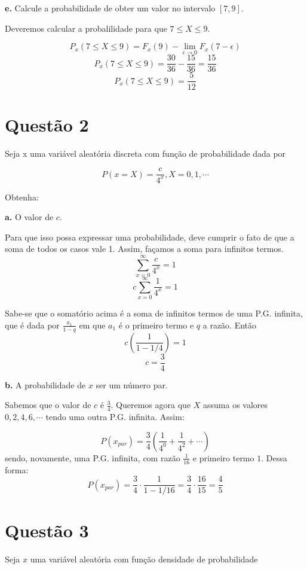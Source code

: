\documentclass[a5paper]{report}
\begin{document}
\textbf{e.}
Calcule a probabilidade de obter um valor no intervalo $[7, 9]$.

Deveremos calcular a probalilidade para que $7 \leq X \leq 9$.

\[P_x(7 \leq X \leq 9) = F_x(9) - \lim_{\epsilon\to0} F_x(7 - \epsilon)\]
\[P_x(7 \leq X \leq 9) = \frac{30}{36} - \frac{15}{36} = \frac{15}{36}\]
\[P_x(7 \leq X \leq 9) = \frac{5}{12}\]


\section*{Questão 2}
Seja x uma variável aleatória discreta com função de probabilidade dada por

\[P(x=X) = \frac{c}{4^x}, X = 0, 1, \cdots\]

Obtenha:

\textbf{a.} O valor de $c$.

Para que isso possa expressar uma probabilidade, deve cumprir o fato de que a soma de todos os casos vale 1. Assim, façamos a soma para infinitos termos.
\[\sum_{x = 0}^{\infty} \frac{c}{4^x} = 1\]
\[c \sum_{x = 0}^{\infty} \frac{1}{4^x} = 1\]

Sabe-se que o somatório acima é a soma de infinitos termos de uma P.G. infinita, que é dada por $\frac{a_1}{1 - q}$ em que $a_1$ é o primeiro termo e $q$ a razão. Então
\[c \left(\frac{1}{1 - 1/4}\right) = 1\]
\[c = \frac{3}{4}\]

\textbf{b.} A probabilidade de $x$ ser um número par.

Sabemos que o valor de $c$ é $\frac{3}{4}$. Queremos agora que $X$ assuma os valores $0, 2, 4, 6, \cdots$ tendo uma outra P.G. infinita. Assim:

\[P(x_{par}) = \frac{3}{4} \left(\frac{1}{4^0} + \frac{1}{4^2} + \cdots \right)\]
sendo, novamente, uma P.G. infinita, com razão $\frac{1}{16}$ e primeiro termo $1$. Dessa forma:
\[P(x_{par}) = \frac{3}{4} \cdot \frac{1}{1 - 1/16} = \frac{3}{4} \cdot \frac{16}{15} = \frac{4}{5}\]


\section*{Questão 3}
Seja $x$ uma variável aleatória com função densidade de probabilidade
\end{document}
